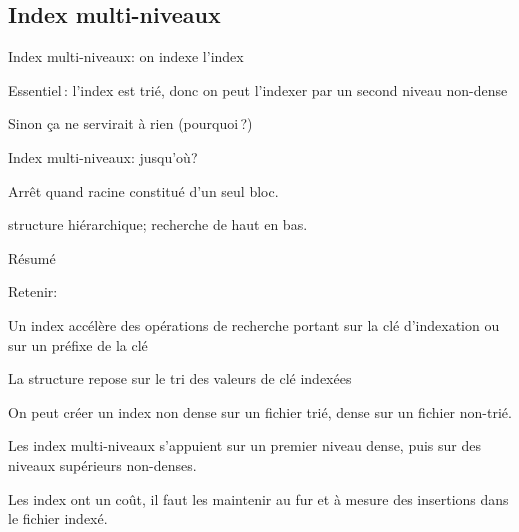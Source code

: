 \subsection{Index multi-niveaux}
\begin{frame}{Index multi-niveaux: on indexe l'index}



\vfill
\begin{blocgauche}
\begin{redbullet}
  \item \alert{Essentiel}\,: l'index est trié,
     donc on peut l'indexer par un second niveau
          \alert{non-dense}
   \item Sinon ça ne servirait à rien (pourquoi\,?)
 \end{redbullet}
\end{blocgauche}

\end{frame}
\begin{frame}{Index multi-niveaux: jusqu'où?}



\vfill
\begin{blocgauche}
\begin{redbullet}
  \item Arrêt quand racine constitué d'un seul bloc.
   \item structure \alert{hiérarchique}; recherche
    \alert{de haut en bas}.
 \end{redbullet}
\end{blocgauche}

\end{frame}


\begin{frame}{Résumé}

\vfill 
\alert{Retenir}:

\begin{redbullet}
  \item Un index accélère des opérations de recherche portant sur la \alert{clé d'indexation} ou sur un préfixe de la clé
  \item La structure repose sur le tri des valeurs de clé indexées
  \item On peut créer un \alert{index non dense} sur un fichier trié, \alert{dense} sur un fichier non-trié.
  \item Les index multi-niveaux s'appuient sur un premier niveau dense, puis sur des niveaux supérieurs non-denses.
\end{redbullet}

\vfill

\begin{blocgauche}
\alert{Les index ont un coût}, il faut les maintenir au fur et à mesure des insertions dans le fichier indexé.
\end{blocgauche}

\end{frame}
